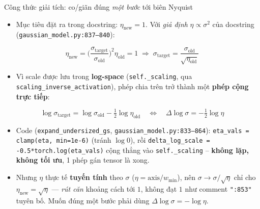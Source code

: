 \begin{frame}{Công thức giải tích: co/giãn đúng \emph{một bước} tới biên Nyquist}
\footnotesize
\begin{itemize}
    \item Mục tiêu đặt ra trong docstring: $\eta_{\text{new}} = 1$. Với \emph{giả định} $\eta\propto\sigma^2$ của docstring (\texttt{gaussian\_model.py:837--840}):
\end{itemize}
\[
\eta_{\text{new}} = \Big(\frac{\sigma_{\text{target}}}{\sigma_{\text{old}}}\Big)^2 \eta_{\text{old}} = 1
\;\Longrightarrow\;
\sigma_{\text{target}} = \frac{\sigma_{\text{old}}}{\sqrt{\eta_{\text{old}}}}
\]
\begin{itemize}
    \item Vì scale được lưu trong \textbf{log-space} (\texttt{self.\_scaling}, qua \texttt{scaling\_inverse\_activation}), phép chia trên trở thành một \textbf{phép cộng trực tiếp}:
\end{itemize}
\[
\log\sigma_{\text{target}} = \log\sigma_{\text{old}} - \tfrac12\log\eta_{\text{old}}
\quad\Longleftrightarrow\quad
\Delta\!\log\sigma = -\tfrac12\log\eta
\]
\begin{itemize}
    \item Code (\texttt{expand\_undersized\_gs}, \texttt{gaussian\_model.py:833--864}): \texttt{eta\_vals = clamp(eta, min=1e-6)} (tránh $\log 0$), rồi \texttt{delta\_log\_scale = -0.5*torch.log(eta\_vals)} cộng thẳng vào \texttt{self.\_scaling} -- \textbf{không lặp, không tối ưu}, 1 phép gán tensor là xong.
    \item \alert{Nhưng} $\eta$ thực tế \textbf{tuyến tính} theo $\sigma$ ($\eta=\text{axis}/w_{\min}$), nên $\sigma\!\to\!\sigma/\sqrt{\eta}$ chỉ cho $\eta_{\text{new}}=\sqrt{\eta}$ --- \emph{rút căn} khoảng cách tới $1$, không đạt $1$ như comment \texttt{":853"} tuyên bố. Muốn đúng một bước phải dùng $\Delta\!\log\sigma=-\log\eta$.
\end{itemize}
\end{frame}

